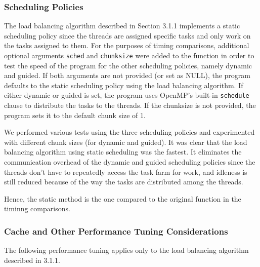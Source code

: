 \subsubsection{Scheduling Policies}
The load balancing algorithm described in Section 3.1.1 implements a static scheduling policy since the threads are assigned specific tasks and only work on the tasks assigned to them. For the purposes of timing comparisons, additional optional arguments \texttt{sched} and \texttt{chunksize} were added to the function in order to test the speed of the program for the other scheduling policies, namely dynamic and guided. If both arguments are not provided (or set as NULL), the program defaults to the static scheduling policy using the load balancing algorithm. If either dynamic or guided is set, the program uses OpenMP's built-in \texttt{schedule} clause to distribute the tasks to the threads. If the chunksize is not provided, the program sets it to the default chunk size of 1.\\
\null

We performed various tests using the three scheduling policies and experimented with different chunk sizes (for dynamic and guided). It was clear that the load balancing algorithm using static scheduling was the fastest. It eliminates the communication overhead of the dynamic and guided scheduling policies since the threads don't have to repeatedly access the task farm for work, and idleness is still reduced because of the way the tasks are distributed among the threads.\\
\null

Hence, the static method is the one compared to the original function in the timinng comparisons.

\subsubsection{Cache and Other Performance Tuning Considerations}
The following performance tuning applies only to the load balancing algorithm described in 3.1.1.

